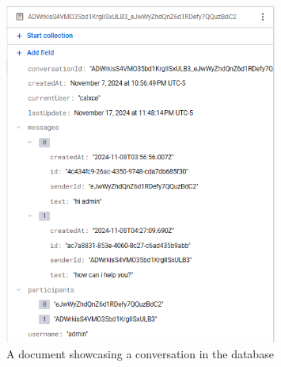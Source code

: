 \begin{figure}[!htb]
    \centering
    \includegraphics[width=0.8\textwidth]{figures/DB Screenshot conversations.png}
    \caption{A document showcasing a conversation in the database}
    \label{fig:conversationDB}
\end{figure}

